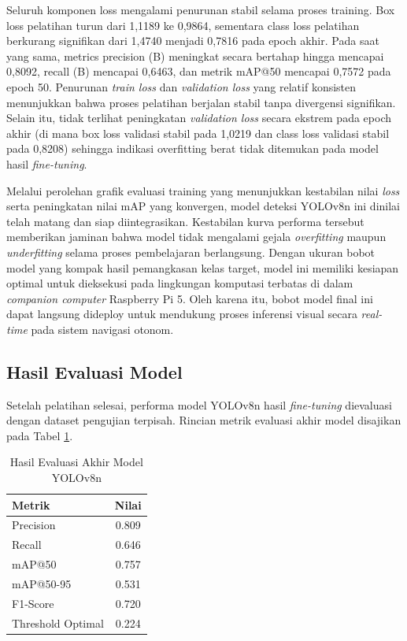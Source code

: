 Seluruh komponen loss mengalami penurunan stabil selama proses training. Box loss pelatihan turun dari 1,1189 ke 0,9864, sementara class loss pelatihan berkurang signifikan dari 1,4740 menjadi 0,7816 pada epoch akhir. Pada saat yang sama, metrics precision (B) meningkat secara bertahap hingga mencapai 0,8092, recall (B) mencapai 0,6463, dan metrik mAP@50 mencapai 0,7572 pada epoch 50. Penurunan \textit{train loss} dan \textit{validation loss} yang relatif konsisten menunjukkan bahwa proses pelatihan berjalan stabil tanpa divergensi signifikan. Selain itu, tidak terlihat peningkatan \textit{validation loss} secara ekstrem pada epoch akhir (di mana box loss validasi stabil pada 1,0219 dan class loss validasi stabil pada 0,8208) sehingga indikasi overfitting berat tidak ditemukan pada model hasil \textit{fine-tuning}.

Melalui perolehan grafik evaluasi training yang menunjukkan kestabilan nilai \textit{loss} serta peningkatan nilai mAP yang konvergen, model deteksi YOLOv8n ini dinilai telah matang dan siap diintegrasikan. Kestabilan kurva performa tersebut memberikan jaminan bahwa model tidak mengalami gejala \textit{overfitting} maupun \textit{underfitting} selama proses pembelajaran berlangsung. Dengan ukuran bobot model yang kompak hasil pemangkasan kelas target, model ini memiliki kesiapan optimal untuk dieksekusi pada lingkungan komputasi terbatas di dalam \textit{companion computer} Raspberry Pi 5. Oleh karena itu, bobot model final ini dapat langsung dideploy untuk mendukung proses inferensi visual secara \textit{real-time} pada sistem navigasi otonom.

\subsection{Hasil Evaluasi Model}

Setelah pelatihan selesai, performa model YOLOv8n hasil \textit{fine-tuning} dievaluasi dengan dataset pengujian terpisah. Rincian metrik evaluasi akhir model disajikan pada Tabel \ref{tab:metric_result}.

\begin{table}[H]
	\centering
	\caption{Hasil Evaluasi Akhir Model YOLOv8n}
	\label{tab:metric_result}
	\renewcommand{\arraystretch}{1.2}
	\begin{tabular}{|l|c|}
		\hline
		Metrik & Nilai \\ \hline
		
		Precision & 0.809 \\ \hline
		Recall & 0.646 \\ \hline
		mAP@50 & 0.757 \\ \hline
		mAP@50-95 & 0.531 \\ \hline
		F1-Score & 0.720 \\ \hline
		Threshold Optimal & 0.224 \\ \hline
	\end{tabular}
\end{table}

